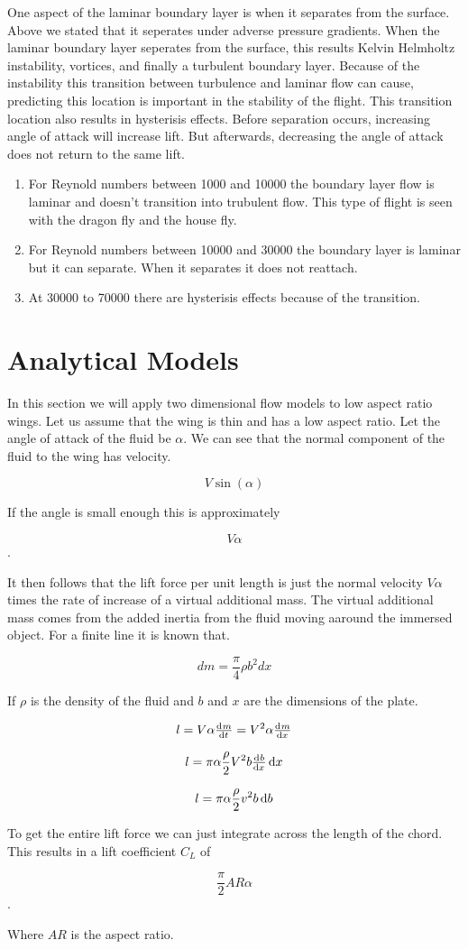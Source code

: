 One aspect of the laminar boundary layer is when it separates from the surface.
Above we stated that it seperates under adverse pressure gradients. When the
laminar boundary layer seperates from the surface, this results Kelvin
Helmholtz instability, vortices, and finally a turbulent boundary layer. 
Because of the instability this transition between turbulence and laminar flow 
can cause, predicting this location is important in the stability of the flight.
This transition location also results in hysterisis effects. Before separation
occurs, increasing angle of attack will increase lift. But afterwards,
decreasing the angle of attack does not return to the same lift.

\begin{enumerate}
\item For Reynold numbers between 1000 and 10000 the boundary layer flow is laminar
and doesn't transition into trubulent flow. This type of flight is seen with
the dragon fly and the house fly. 
\item  For Reynold numbers between 10000 and 30000 the boundary layer is laminar but
it can separate. When it separates it does not reattach.
\item At 30000 to 70000 there are hysterisis effects because of the transition. 

\end{enumerate}

\section{Analytical Models}

In this section we will apply two dimensional flow models to low aspect ratio wings. 
Let us assume that the wing is thin and has a low aspect ratio. Let the angle of attack
of the fluid be $\alpha$. We can see that the normal component of the fluid to the
wing has velocity.

\[V\sin(\alpha)\]

If the angle is small enough this is approximately

\[V\alpha\].

It then follows that the lift force per unit length is just the normal velocity $V\alpha$ times the
rate of increase of a virtual additional mass. The virtual additional mass comes from the
added inertia from the fluid moving aaround the immersed object. For a finite line it is known
that.

\[dm=\frac{\pi}{4}\rho b^2 dx\]

If $\rho$ is the density of the fluid and $b$ and $x$ are the dimensions of the plate.

\[l = V\alpha \od{m}{t} = V^2\alpha \od{m}{x} \]

\[l = \pi \alpha \frac{\rho}{2}V^2 b \od{b}{x} \dif{x} \]

\[l = \pi \alpha \frac{\rho}{2} v^2 b \dif{b} \]

To get the entire lift force we can just integrate across the length of the chord. This
results in a lift coefficient $C_L$ of

\[ \frac{\pi}{2}AR \alpha \].

Where $AR$ is the aspect ratio.

